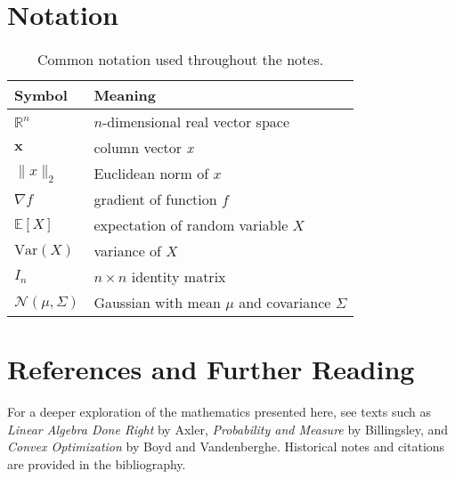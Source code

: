 \section{Notation}
\begin{table}[h]
    \centering
    \begin{tabular}{ll}
        \hline
        Symbol & Meaning \\ \hline
        $\mathbb{R}^n$ & $n$-dimensional real vector space \\
        $\mathbf{x}$ & column vector \emph{x} \\
        $\|x\|_2$ & Euclidean norm of $x$ \\
        $\nabla f$ & gradient of function $f$ \\
        $\mathbb{E}[X]$ & expectation of random variable $X$ \\
        $\mathrm{Var}(X)$ & variance of $X$ \\
        $I_n$ & $n\times n$ identity matrix \\
        $\mathcal{N}(\mu,\Sigma)$ & Gaussian with mean $\mu$ and covariance $\Sigma$ \\
        \hline
    \end{tabular}
    \caption{Common notation used throughout the notes.}
\end{table}

\section{References and Further Reading}
For a deeper exploration of the mathematics presented here, see texts such as \emph{Linear Algebra Done Right} by Axler, \emph{Probability and Measure} by Billingsley, and \emph{Convex Optimization} by Boyd and Vandenberghe. Historical notes and citations are provided in the bibliography.

